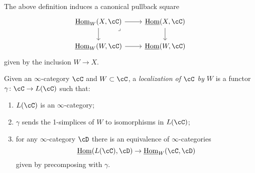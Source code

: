 \documentclass[a4paper,fontsize=12pt]{scrartcl}
\begin{document}
\begin{rmk}
  The above definition induces a canonical pullback square
  \[\begin{tikzcd}
    {\Home_W(X,\cC)} & {\Home(X,\cC)} \\
    {\Home_W(W,\cC)} & {\Home(W,\cC)}
    \arrow[from=1-1, to=2-1]
    \arrow[from=2-1, to=2-2]
    \arrow[from=1-2, to=2-2]
    \arrow[from=1-1, to=1-2]
    \arrow["\lrcorner"{anchor=center, pos=0.125}, draw=none, from=1-1, to=2-2]
  \end{tikzcd}\]
  given by the inclusion $W\rightarrow X$.
\end{rmk}

\begin{defn}
  Given an $\infty$-category $\cC$ and $W\subset\cC$, a \emph{localization of
  $\cC$ by $W$} is a functor $\gamma\colon\cC\rightarrow L(\cC)$ such that:
  \begin{enumerate}
    \item $L(\cC)$ is an $\infty$-category;
    \item $\gamma$ sends the 1-simplices of $W$ to isomorphisms in $L(\cC)$;
    \item for any $\infty$-category $\cD$ there is an equivalence of
      $\infty$-categories
      \[\Home(L(\cC),\cD)\rightarrow\Home_W(\cC,\cD)\]
      given by precomposing with $\gamma$.
  \end{enumerate}
\end{defn}

\end{document}
